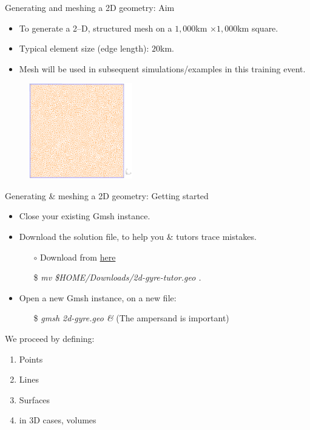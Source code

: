 \documentclass[t]{beamer}
\begin{document}
\begin{frame}{Generating and meshing a 2D geometry: Aim}

\begin{itemize}
    \item To generate a 2--D, structured mesh on a $1,000$km $\times 1,000$km square.
    \item Typical element size (edge length): $20$km.
    \item Mesh will be used in subsequent simulations/examples in this training event.
\end{itemize}

\begin{figure}[htbp]
 \centering
  \includegraphics[width=0.4\textwidth]{../figures/2d-example-mesh}
\end{figure}

\end{frame}


\begin{frame}{Generating \& meshing a 2D geometry: Getting started}
    \begin{itemize}
        \item Close your existing Gmsh instance.
        \item Download the solution file, to help you \& tutors trace mistakes.
        \begin{itemize}
            \item[$\circ$] Download from \href{http://figshare.com/s/85271e16603d11e4840b06ec4bbcf141}{here}
            \item[\$] \emph{mv \$HOME/Downloads/2d-gyre-tutor.geo .}
        \end{itemize}
        \item Open a new Gmsh instance, on a new file:
        \begin{itemize}
            \item[\$] \emph{gmsh 2d-gyre.geo \&} (The ampersand is important)\\[10pt]
        \end{itemize}
    \end{itemize}
    We proceed by defining:
    \begin{enumerate}
        \item Points
        \item Lines
        \item Surfaces
        \item in 3D cases, volumes
    \end{enumerate}
\end{frame}
\end{document}
